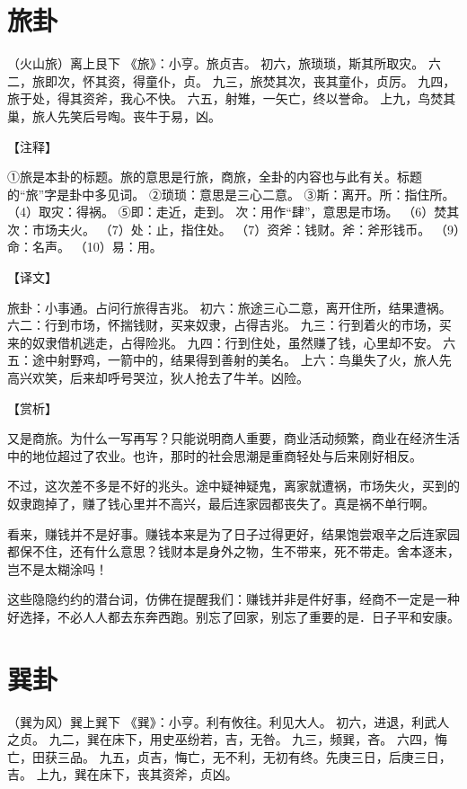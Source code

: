 \documentclass[a4paper,12pt,UTF8,twoside]{ctexbook}
\begin{document}
\chapter{旅卦}

（火山旅）离上艮下
《旅》：小亨。旅贞吉。
初六，旅琐琐，斯其所取灾。
六二，旅即次，怀其资，得童仆，贞。
九三，旅焚其次，丧其童仆，贞厉。
九四，旅于处，得其资斧，我心不快。
六五，射雉，一矢亡，终以誉命。
上九，鸟焚其巢，旅人先笑后号啕。丧牛于易，凶。

【注释】

①旅是本卦的标题。旅的意思是行旅，商旅，全卦的内容也与此有关。标题的“旅”字是卦中多见词。
②琐琐：意思是三心二意。
③斯：离开。所：指住所。
（4）取灾：得祸。
⑤即：走近，走到。 次：用作“肆”，意思是市场。
（6）焚其次：市场夫火。
（7）处：止，指住处。
（7）资斧：钱财。斧：斧形钱币。
（9）命：名声。
（10）易：用。

【译文】

旅卦：小事通。占问行旅得吉兆。
初六：旅途三心二意，离开住所，结果遭祸。
六二：行到市场，怀揣钱财，买来奴隶，占得吉兆。
九三：行到着火的市场，买来的奴隶借机逃走，占得险兆。
九四：行到住处，虽然赚了钱，心里却不安。
六五：途中射野鸡，一箭中的，结果得到善射的美名。
上六：鸟巢失了火，旅人先高兴欢笑，后来却呼号哭泣，狄人抢去了牛羊。凶险。

【赏析】

又是商旅。为什么一写再写？只能说明商人重要，商业活动频繁，商业在经济生活中的地位超过了农业。也许，那时的社会思潮是重商轻处与后来刚好相反。

不过，这次差不多是不好的兆头。途中疑神疑鬼，离家就遭祸，市场失火，买到的奴隶跑掉了，赚了钱心里并不高兴，最后连家园都丧失了。真是祸不单行啊。

看来，赚钱并不是好事。赚钱本来是为了日子过得更好，结果饱尝艰辛之后连家园都保不住，还有什么意思？钱财本是身外之物，生不带来，死不带走。舍本逐末，岂不是太糊涂吗！

这些隐隐约约的潜台词，仿佛在提醒我们：赚钱并非是件好事，经商不一定是一种好选择，不必人人都去东奔西跑。别忘了回家，别忘了重要的是．日子平和安康。

\chapter{巽卦}

（巽为风）巽上巽下
《巽》：小亨。利有攸往。利见大人。
初六，进退，利武人之贞。
九二，巽在床下，用史巫纷若，吉，无咎。
九三，频巽，吝。
六四，悔亡，田获三品。
九五，贞吉，悔亡，无不利，无初有终。先庚三日，后庚三日，吉。
上九，巽在床下，丧其资斧，贞凶。
\end{document}
